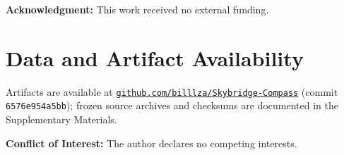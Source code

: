 \documentclass[10pt,journal,compsoc]{IEEEtran}
\newcommand{\artifacturl}{https://github.com/billlza/Skybridge-Compass}
\newcommand{\artifactsha}{6576e954a5bb}
\begin{document}
\noindent\textbf{Acknowledgment:} This work received no external funding.

\section*{Data and Artifact Availability}

\noindent Artifacts are available at
\href{\artifacturl}{\nolinkurl{github.com/billlza/Skybridge-Compass}}
(commit \texttt{\artifactsha}); frozen source archives and checksums are
documented in the Supplementary Materials.

\noindent\textbf{Conflict of Interest:} The author declares no competing interests.

\end{document}
